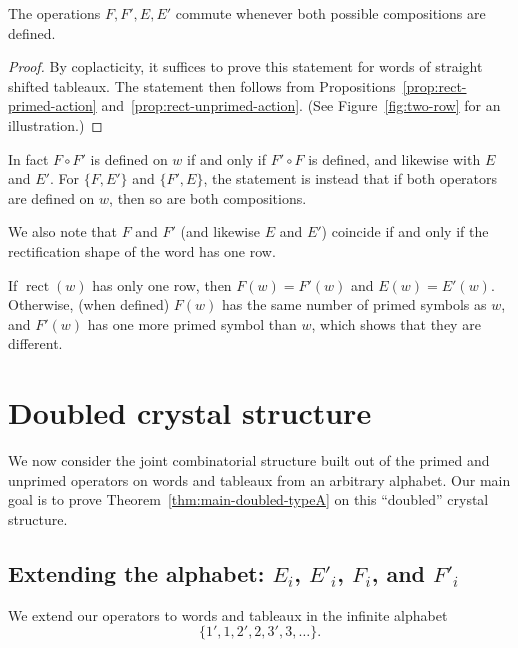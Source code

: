 \documentclass[ALCO,ThmDefs,Unicode,epreuves]{cedram}
\DeclareMathOperator{\rectify}{rect}
\begin{document}
\begin{prop} \label{prop:commutes}
The operations $F, F', E, E'$ commute whenever both possible compositions are defined.
\end{prop}

\begin{proof}
By coplacticity, it suffices to prove this statement for words of straight shifted tableaux. The statement then follows from Propositions~\ref{prop:rect-primed-action} and~\ref{prop:rect-unprimed-action}. (See Figure~\ref{fig:two-row} for an illustration.)
\end{proof} 

\begin{rema}
In fact $F\circ F'$ is defined on $w$ if and only if $F'\circ F$ is defined, and likewise with $E$ and $E'$. For $\{F,E'\}$ and $\{F',E\}$, the statement is instead that if both operators are defined on $w$, then so are both compositions.
\end{rema}

We also note that $F$ and $F'$ (and likewise $E$ and $E'$) coincide if and only if the rectification shape of the word has one row.

\begin{coro}
If $\rectify(w)$ has only one row, then $F(w) = F'(w)$ and $E(w) = E'(w)$. Otherwise, \textup{(}when defined\textup{)}
$F(w)$ has the same number of primed symbols as $w$, and $F'(w)$ has one more primed symbol than $w$, which shows that they are different.
\end{coro}

\section{Doubled crystal structure}\label{sec:crystal}

We now consider the joint combinatorial structure built out of the primed and unprimed operators on words and tableaux from an arbitrary alphabet. Our main goal is to prove Theorem~\ref{thm:main-doubled-typeA} on this ``doubled'' crystal structure.

\subsection{Extending the alphabet: \texorpdfstring{$E_i$}{Ei}, \texorpdfstring{$E'_i$}{E'i}, \texorpdfstring{$F_i$}{Fi}, and \texorpdfstring{$F'_i$}{F'i}}

We extend our operators to words and tableaux in the infinite alphabet 
\[
\{1',1,2',2,3',3,\ldots\}.
\]
\end{document}
